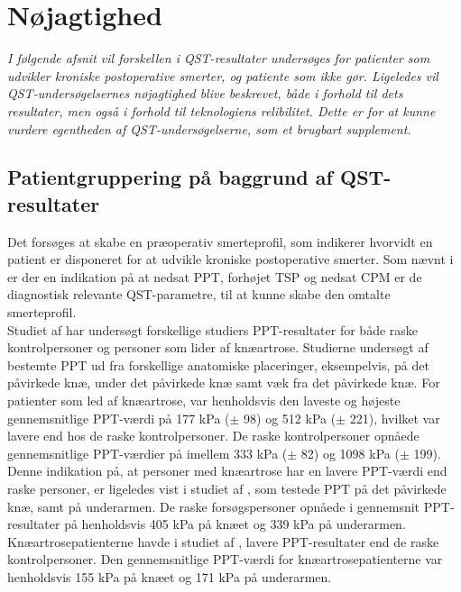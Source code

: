 \section{Nøjagtighed}
\textit{I følgende afsnit vil forskellen i QST-resultater undersøges for patienter som udvikler kroniske postoperative smerter, og patiente som ikke gør. Ligeledes vil QST-undersøgelsernes nøjagtighed blive beskrevet, både i forhold til dets resultater, men også i forhold til teknologiens relibilitet. Dette er for at kunne vurdere egentheden af QST-undersøgelserne, som et brugbart supplement.}

\subsection{Patientgruppering på baggrund af QST-resultater}
Det forsøges at skabe en præoperativ smerteprofil, som indikerer hvorvidt en patient er disponeret for at udvikle kroniske postoperative smerter. Som nævnt i  er der en indikation på at nedsat PPT, forhøjet TSP og nedsat CPM er de diagnostisk relevante QST-parametre, til at kunne skabe den omtalte smerteprofil. \\
Studiet af  har undersøgt forskellige studiers PPT-resultater for både raske kontrolpersoner og personer som lider af knæartrose. Studierne undersøgt af  bestemte PPT ud fra forskellige anatomiske placeringer, eksempelvis, på det påvirkede knæ, under det påvirkede knæ samt væk fra det påvirkede knæ. For patienter som led af knæartrose, var henholdsvis den laveste og højeste gennemsnitlige PPT-værdi på 177 kPa ($\pm$ 98) og 512 kPa ($\pm$ 221), hvilket var lavere end hos de raske kontrolpersoner. De raske kontrolpersoner opnåede gennemsnitlige PPT-værdier på imellem 333 kPa ($\pm$ 82) og 1098 kPa ($\pm$ 199). \citep{Suokas2012} Denne indikation på, at personer med knæartrose har en lavere PPT-værdi end raske personer, er ligeledes vist i studiet af , som testede PPT på det påvirkede knæ, samt på underarmen. De raske forsøgspersoner opnåede i gennemsnit PPT-resultater på henholdsvis 405 kPa på knæet og 339 kPa på underarmen. Knæartrosepatienterne havde i studiet af , lavere PPT-resultater end de raske kontrolpersoner. Den gennemsnitlige PPT-værdi for knæartrosepatienterne var henholdsvis 155 kPa på knæet og 171 kPa på underarmen. \citep{Wylde2013} 

